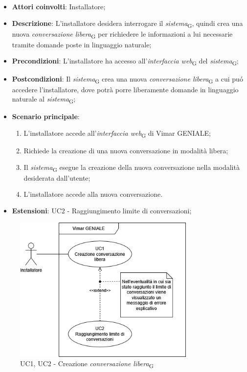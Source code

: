 
\begin{itemize}
    \item \textbf{Attori coinvolti}: Installatore;
    \item \textbf{Descrizione}: L’installatore desidera interrogare il \textit{sistema}\textsubscript{G}, quindi crea una nuova \textit{conversazione libera}\textsubscript{G} per richiedere le informazioni a lui necessarie tramite domande poste in linguaggio naturale;
    \item \textbf{Precondizioni}: L’installatore ha accesso all’\textit{interfaccia web}\textsubscript{G} del \textit{sistema}\textsubscript{G};
    \item \textbf{Postcondizioni}: Il \textit{sistema}\textsubscript{G} crea una nuova \textit{conversazione libera}\textsubscript{G} a cui puó accedere l’installatore, dove potrà porre liberamente domande in linguaggio naturale al \textit{sistema}\textsubscript{G};
    \item \textbf{Scenario principale}:
    \begin{enumerate}
    \item L’installatore accede all’\textit{interfaccia web}\textsubscript{G} di Vimar GENIALE;
    \item Richiede la creazione di una nuova conversazione in modalità libera;
    \item Il \textit{sistema}\textsubscript{G} esegue la creazione della nuova conversazione nella modalità desiderata dall’utente;
    \item  L’installatore accede alla nuova conversazione.
    \end{enumerate}
    \item \textbf{Estensioni}: UC2 - Raggiungimento limite di conversazioni;
\end{itemize}
\begin{figure}[H]
\centering
\includegraphics[width=0.8\textwidth]{contents/casi_duso/png/UC1.png}
\caption{UC1, UC2 - Creazione \textit{conversazione libera}\textsubscript{G}}
\end{figure}

